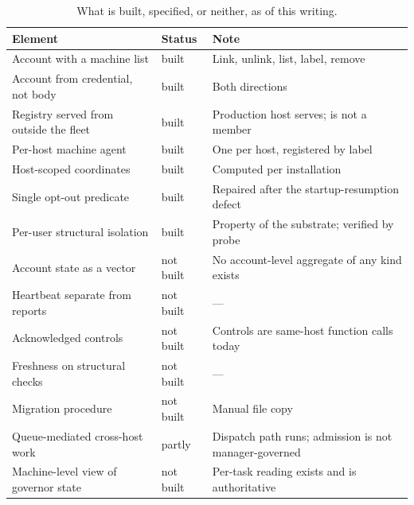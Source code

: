 \documentclass[11pt]{article}
\begin{document}
\begin{table}[h]
\centering\small
\caption{What is built, specified, or neither, as of this writing.}
\label{tab:status}
\begin{tabular}{@{}L{5.6cm}L{2.2cm}L{5.6cm}@{}}
\toprule
\textbf{Element} & \textbf{Status} & \textbf{Note} \\
\midrule
Account with a machine list & built & Link, unlink, list, label, remove \\
Account from credential, not body & built & Both directions \\
Registry served from outside the fleet & built & Production host serves; is not a member \\
Per-host machine agent & built & One per host, registered by label \\
Host-scoped coordinates & built & Computed per installation \\
Single opt-out predicate & built & Repaired after the startup-resumption defect \\
Per-user structural isolation & built & Property of the substrate; verified by probe \\
Account state as a vector & not built & No account-level aggregate of any kind exists \\
Heartbeat separate from reports & not built & --- \\
Acknowledged controls & not built & Controls are same-host function calls today \\
Freshness on structural checks & not built & --- \\
Migration procedure & not built & Manual file copy \\
Queue-mediated cross-host work & partly & Dispatch path runs; admission is not manager-governed \\
Machine-level view of governor state & not built & Per-task reading exists and is authoritative \\
\bottomrule
\end{tabular}
\end{table}



\end{document}
